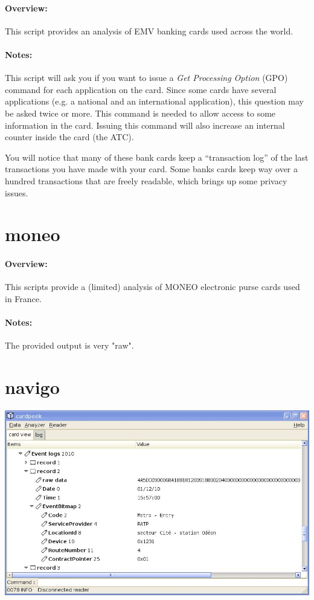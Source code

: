 \documentclass[11pt]{report}
\begin{document}
\paragraph{Overview:}
This script provides an analysis of EMV banking cards used across the world.

\paragraph{Notes:}
This script will ask you if you want to issue a \emph{Get Processing Option} (GPO) command for each application on the card.
Since some cards have several applications (e.g. a national and an international application), this question may be asked twice or more.
This command is needed to allow access to some information in the card.
Issuing this command will also increase an internal counter inside the card (the ATC). 

You will notice that many of these bank cards keep a ``transaction log'' of the last transactions you have made with your card.
Some banks cards keep way over a hundred transactions that are freely readable, which brings up some privacy issues.

\section{moneo}

\paragraph{Overview:}
This scripts provide a (limited) analysis of MONEO electronic purse cards used in France.

\paragraph{Notes:}
The provided output is very "raw".

\section{navigo}

\begin{center}
\includegraphics[width=.75\textwidth]{graphics/sample-navigo.jpg}
\end{center}
\end{document}

